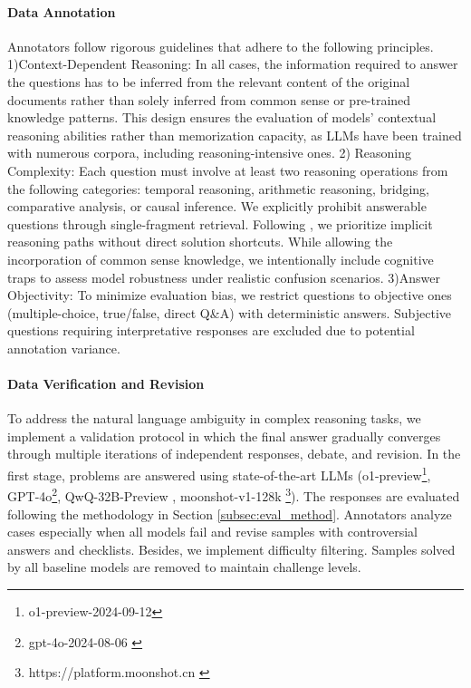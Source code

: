 \paragraph{Data Annotation}
Annotators follow rigorous guidelines that adhere to the following principles.
1)Context-Dependent Reasoning: 
In all cases,  the information required to answer the questions has to be inferred from the relevant content of the original documents rather than solely inferred from common sense or pre-trained knowledge patterns.
This design ensures the evaluation of models' contextual reasoning abilities rather than memorization capacity, as LLMs have been trained with numerous corpora, including reasoning-intensive ones.
2) Reasoning Complexity: Each question must involve at least two reasoning operations from the following categories: temporal reasoning, arithmetic reasoning, bridging, comparative analysis, or causal inference. 
We explicitly prohibit answerable questions through single-fragment retrieval.
Following \cite{geva2021didaristotleuselaptop}, we prioritize implicit reasoning paths without direct solution shortcuts. 
While allowing the incorporation of common sense knowledge, we intentionally include cognitive traps to assess model robustness under realistic confusion scenarios.
3)Answer Objectivity: To minimize evaluation bias, we restrict questions to objective ones (multiple-choice, true/false, direct Q\&A) with deterministic answers. 
Subjective questions requiring interpretative responses are excluded due to potential annotation variance.

\paragraph{Data Verification and Revision}
To address the natural language ambiguity in complex reasoning tasks, we implement a validation protocol in which the final answer gradually converges through multiple iterations of independent responses, debate, and revision. 
In the first stage, problems are answered using state-of-the-art LLMs (o1-preview\footnote{o1-preview-2024-09-12}, GPT-4o\footnote{gpt-4o-2024-08-06 \label{footnote:4o}}, QwQ-32B-Preview \cite{qwq-32b-preview}, moonshot-v1-128k \footnote{https://platform.moonshot.cn \label{footnote:kimi}}).
The responses are evaluated following the methodology in Section \ref{subsec:eval_method}. 
Annotators analyze cases especially when all models fail and revise samples with controversial answers and checklists.
Besides, we implement difficulty filtering. 
Samples solved by all baseline models are removed to maintain challenge levels. 

